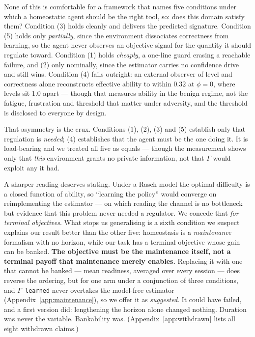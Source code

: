 \documentclass{article}
\begin{document}
None of this is comfortable for a framework that names five conditions under which a homeostatic agent should be the right tool, so: does this domain satisfy them? Condition (3) holds cleanly and delivers the predicted signature. Condition (5) holds only \emph{partially}, since the environment dissociates correctness from learning, so the agent never observes an objective signal for the quantity it should regulate toward. Condition (1) holds \emph{cheaply}, a one-line guard erasing a reachable failure, and (2) only nominally, since the estimator carries no confidence drive and still wins. Condition (4) fails outright: an external observer of level and correctness alone reconstructs effective ability to within $0.32$ at $\phi{=}0$, where levels sit $1.0$ apart --- though that measures ability in the benign regime, not the fatigue, frustration and threshold that matter under adversity, and the threshold is disclosed to everyone by design.

That asymmetry is the crux. Conditions (1), (2), (3) and (5) establish only that regulation is \emph{needed}; (4) establishes that the agent must be the one doing it. It is load-bearing and we treated all five as equals --- though the measurement shows only that \emph{this} environment grants no private information, not that $\Gamma$ would exploit any it had.

A sharper reading deserves stating. Under a Rasch model the optimal difficulty is a closed function of ability, so ``learning the policy'' would converge on reimplementing the estimator --- on which reading the channel is no bottleneck but evidence that this problem never needed a regulator. We concede that \emph{for terminal objectives}. What stops us generalising is a sixth condition we suspect explains our result better than the other five: homeostasis is a \emph{maintenance} formalism with no horizon, while our task has a terminal objective whose gain can be banked. \label{sec:sixth}\textbf{The objective must be the maintenance itself, not a terminal payoff that maintenance merely enables.} Replacing it with one that cannot be banked --- mean readiness, averaged over every session --- does reverse the ordering, but for one arm under a conjunction of three conditions, and \texttt{$\Gamma$\_learned} never overtakes the model-free estimator (Appendix~\ref{app:maintenance}), so we offer it as \emph{suggested}. It could have failed, and a first version did: lengthening the horizon alone changed nothing. Duration was never the variable. Bankability was. (Appendix~\ref{app:withdrawn} lists all eight withdrawn claims.)
\end{document}

